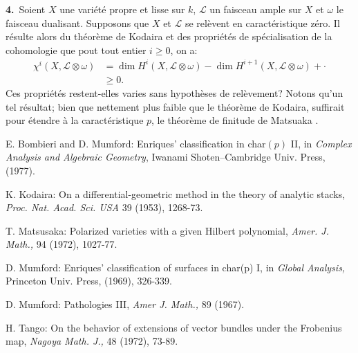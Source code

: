 \medskip
\noindent
{\bf 4.}~Soient $X$ une vari\'et\'e propre et lisse sur $k$,
$\mathscr{L}$ un faisceau ample sur $X$ et $\omega$ le faisceau
dualisant. Supposons que $X$ et $\mathscr{L}$ se rel\`event en
caract\'eristique z\'ero. Il r\'esulte alors du th\'eor\`eme de
Kodaira et des propri\'et\'es de sp\'ecialisation de la cohomologie
que pout tout entier $i\geq 0$, on a:
\begin{align*}
\chi^{i}(X,\mathscr{L}\otimes \omega) &= \dim
H^{i}(X,\mathscr{L}\otimes\omega)-\dim
H^{i+1}(X,\mathscr{L}\otimes \omega)+\cdot\\
&\geq 0.
\end{align*}
Ces propri\'et\'es restent-elles varies sans hypoth\`eses de
rel\`evement? Notons qu'un tel r\'esultat; bien que nettement plus
faible que le th\'eor\`eme de Kodaira, suffirait pour \'etendre \`a la
caract\'eristique $p$, le th\'eor\`eme de finitude de
Matsuaka \cite{art03-key3}. 

\begin{thebibliography}{}
 E. Bombieri and D. Mumford: Enriques'
classification in char$(p)$ II, in {\em Complex Analysis and Algebraic
Geometry}, Iwanami Shoten--Cambridge Univ. Press, (1977).

 K. Kodaira: On a differential-geometric method in
the theory of analytic stacks, {\em Proc. Nat. Acad. Sci. USA} 39
(1953), 1268-73.

 T. Matsusaka: Polarized varieties with a given
Hilbert polynomial, {\em Amer. J. Math.,} 94 (1972), 1027-77.

 D. Mumford: Enriques' classification of surfaces
in char(p) I, in {\em Global Analysis,} Princeton Univ. Press, (1969),
326-339. 

 D. Mumford: Pathologies III, {\em Amer J. Math.,}
89 (1967).

 H. Tango: On the behavior of extensions of vector
bundles under the Frobenius map, {\em Nagoya Math. J.,} 48 (1972), 73-89.
\end{thebibliography}

\vfill\eject
~\phantom{a}
\thispagestyle{empty}
